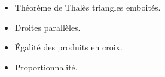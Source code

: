 \begin{prerequis}[Prérequis]    
    \begin{itemize}
        \item Théorème de Thalès triangles emboités.
        \item Droites parallèles.
        \item Égalité des produits en croix.
        \item Proportionnalité.        
    \end{itemize}
\end{prerequis}
